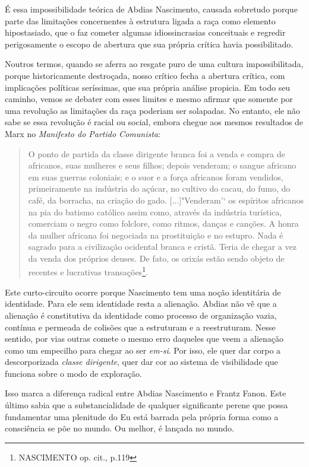 É essa impossibilidade teórica de Abdias Nascimento, causada sobretudo
porque parte das limitações concernentes à estrutura ligada a raça como
elemento hipostasiado, que o faz cometer algumas idiossincrasias
conceituais e regredir perigosamente o escopo de abertura que sua
própria crítica havia possibilitado.

Noutros termos, quando se aferra ao resgate puro de uma cultura
impossibilitada, porque historicamente destroçada, nosso crítico fecha a
abertura crítica, com implicações políticas seríssimas, que sua própria
análise propicia. Em todo seu caminho, vemos se debater com esses
limites e mesmo afirmar que somente por uma revolução as limitações da
raça poderiam ser solapadas. No entanto, ele não sabe se essa revolução
é racial ou social, embora chegue aos mesmos resultados de Marx no
\emph{Manifesto do Partido Comunista}:

\begin{quote}
O ponto de partida da classe dirigente branca foi a venda e compra de
africanos, suas mulheres e seus filhos; depois venderam; o sangue
africano em suas guerras coloniais; e o suor e a força africanos foram
vendidos, primeiramente na indústria do açúcar, no cultivo do cacau, do
fumo, do café, da borracha, na criação do gado. {[}...{]}"Venderam'` os
espíritos africanos na pia do batismo católico assim como, através da
indústria turística, comerciam o negro como folclore, como ritmos,
danças e canções. A honra da mulher africana foi negociada na
prostituição e no estupro. Nada é sagrado para a civilização ocidental
branca e cristã. Teria de chegar a vez da venda dos próprios deuses. De
fato, os orixás estão sendo objeto de recentes e lucrativas
transações\footnote{NASCIMENTO op. cit., p.119}.
\end{quote}

Este curto-circuito ocorre porque Nascimento tem uma noção identitária
de identidade. Para ele sem identidade resta a alienação. Abdias não vê
que a alienação é constitutiva da identidade como processo de
organização vazia, contínua e permeada de colisões que a estruturam e a
reestruturam. Nesse sentido, por vias outras comete o mesmo erro
daqueles que veem a alienação como um empecilho para chegar ao ser
\emph{em-si}. Por isso, ele quer dar corpo a descorporizada \emph{classe
dirigente}, quer dar cor ao sistema de visibilidade que funciona sobre o
modo de exploração.

Isso marca a diferença radical entre Abdias Nascimento e Frantz Fanon.
Este último sabia que a substancialidade de qualquer significante perene
que possa fundamentar uma plenitude do Eu está barrada pela própria
forma como a consciência se põe no mundo. Ou melhor, é lançada no mundo.

